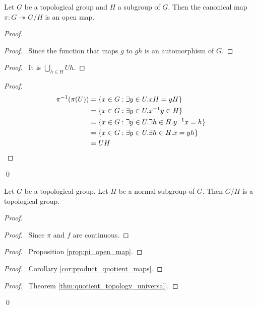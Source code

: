 \begin{prop}
\label{prop:pi_open_map}
Let $G$ be a topological group and $H$ a subgroup of $G$. Then the canonical map $\pi : G \twoheadrightarrow G / H$ is an open map.
\end{prop}

\begin{proof}
\pf
{}
\begin{proof}
	\pf\ Since the function that maps $g$ to $gh$ is an automorphism of $G$.
\end{proof}
\begin{proof}
	\pf\ It is $\bigcup_{h \in H} Uh$.
\end{proof}
\begin{proof}
	\pf
	\begin{align*}
		{\pi}^{-1}(\pi(U)) & = \{ x \in G : \exists y \in U. xH = yH \} \\
		& = \{ x \in G : \exists y \in U. {x}^{-1} y \in H \} \\
		& = \{ x \in G : \exists y \in U. \exists h \in H. {y}^{-1} x= h \} \\
		& = \{ x \in G : \exists y \in U. \exists h \in H. x = yh \} \\
		& = UH
	\end{align*}
\end{proof}
\qed
\end{proof}

\begin{prop}
Let $G$ be a topological group. Let $H$ be a normal subgroup of $G$. Then $G / H$ is a topological group.
\end{prop}

\begin{proof}
\pf
{}
\begin{proof}
	\pf\ Since $\pi$ and $f$ are continuous.
\end{proof}
\begin{proof}
	\pf\ Proposition \ref{prop:pi_open_map}.
\end{proof}
\begin{proof}
	\pf\ Corollary \ref{cor:product_quotient_maps}.
\end{proof}
\begin{proof}
	\pf\ Theorem \ref{thm:quotient_topology_universal}.
\end{proof}
\qed
\end{proof}

